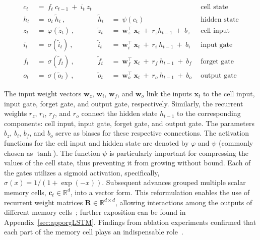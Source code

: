 \begin{align}
c_t \ &= \  f_t \ c_{t-1} \ + \ i_t \ z_t &  & &\text{cell state} \\
h_t  \ &= \ o_t \ \tilde{h}_t \ , & \tilde{h}_t \ &= \ \psi \left( c_t\right)
  &\text{hidden state} \\
z_t \ &= \ \varphi \left( \tilde{z}_t \right) \ , 
  &\tilde{z}_t \ &=  \ \mathbf{w}^\top_{z} \ \mathbf{x}_t \ + \
  r_{z}  h_{t-1} \ + \  b_{z} \ \
  &\text{cell input} \\
i_t \ &= \ \sigma \left( \tilde{i}_t  \right) \ , 
  &\tilde{i}_t \ &= \ \mathbf{w}^\top_{i} \ \mathbf{x}_t \ + \
  r_{i}  \ h_{t-1} \ + \  b_{i} \ \
  &\text{input gate} \\
f_t \ &= \ \sigma \left(  \tilde{f}_t \right) \ , 
  &\tilde{f}_t \ &= \ \mathbf{w}^\top_{f} \ \mathbf{x}_t  \ + \
  r_{f}  \ h_{t-1} \ + \  b_{f} \ \
  &\text{forget gate} \\
o_t \ &= \ \sigma \left( \tilde{o}_t \right) \ , 
  &\tilde{o}_t  \ &= \ \mathbf{w}^\top_{o} \ \mathbf{x}_t \ + \
  r_{o}  \ h_{t-1} \ + \  b_{o} \ \
  &\text{output gate} 
\end{align}

The input weight vectors $\mathbf{w}_{z}$, $\mathbf{w}_{i}$, $\mathbf{w}_{f}$, and $\mathbf{w}_{o}$ link the inputs $\mathbf{x}_t$ to the cell input, input gate, forget gate, and output gate, respectively. Similarly, the recurrent weights $r_{z}$, $r_{i}$, $r_{f}$, and $r_{o}$ connect the hidden state $h_{t-1}$ to the corresponding components: cell input, input gate, forget gate, and output gate. The parameters $b_{z}$, $b_{i}$, $b_{f}$, and $b_{o}$ serve as biases for these respective connections. The activation functions for the cell input and hidden state are denoted by $\varphi$ and $\psi$ (commonly chosen as $\tanh$). The function $\psi$ is particularly important for compressing the values of the cell state, thus preventing it from growing without bound. Each of the gates utilizes a sigmoid activation, specifically,
$\sigma \left( x \right)= 1/(1+\exp(-x))$.
Subsequent advances grouped multiple scalar memory cells, $\mathbf{c}_t \in \mathbb{R}^{d}$, into a vector form. This reformulation enables the use of recurrent weight matrices $\mathbf{R} \in \mathbb{R}^{d \times d}$, allowing interactions among the outputs of different memory cells~\citep{Greff:15}; further exposition can be found in Appendix~\ref{sec:apporgLSTM}. Findings from ablation experiments confirmed that each part of the memory cell plays an indispensable role~\citep{Greff:15}.

